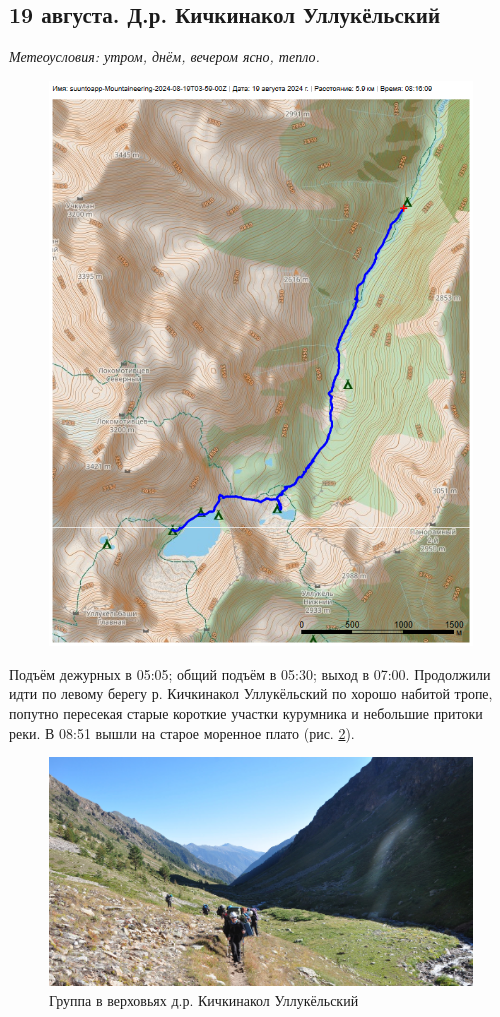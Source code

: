 \subsection{19 августа. Д.р. Кичкинакол Уллукёльский}
\textit{Метеоусловия: утром, днём, вечером ясно, тепло.}

\begin{figure}[h!]
	\centering
	\includegraphics[angle=0, width=0.7\linewidth]{../pics/mini_maps/19}
	\label{fig:mini_19}
\end{figure}

Подъём дежурных в 05:05; общий подъём в 05:30; выход в 07:00.
Продолжили идти по левому берегу р. Кичкинакол Уллукёльский по хорошо набитой тропе, попутно  пересекая старые короткие участки курумника и небольшие притоки реки. В 08:51 вышли на старое моренное плато (рис. \ref{fig:DSC_0692}).

\begin{figure}[h!]
	\centering
	\includegraphics[width=0.7\linewidth]{../pics/DSC_0692}
	\caption{Группа в верховьях д.р. Кичкинакол Уллукёльский}
	\label{fig:DSC_0692}
\end{figure}

